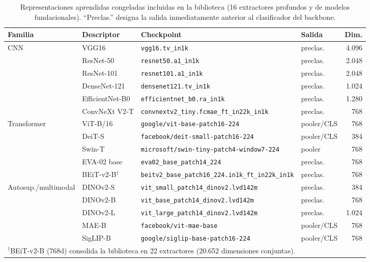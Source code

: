 \begin{table}[!ht]
\centering
\caption{Representaciones aprendidas congeladas incluidas en la biblioteca (16 extractores profundos y de modelos fundacionales). ``Preclas.'' designa la salida inmediatamente anterior al clasificador del backbone.}
\label{tab:extractores-aprendidos}
\fontsize{9}{11}\selectfont
\begin{tabular}{@{}ll>{\raggedright\arraybackslash}p{6.5cm}lr@{}}
\toprule
Familia & Descriptor & Checkpoint & Salida & Dim. \\
\midrule
CNN & VGG16 & \texttt{vgg16.tv\_in1k} & preclas. & 4.096 \\
 & ResNet-50 & \texttt{resnet50.a1\_in1k} & preclas. & 2.048 \\
 & ResNet-101 & \texttt{resnet101.a1\_in1k} & preclas. & 2.048 \\
 & DenseNet-121 & \texttt{densenet121.tv\_in1k} & preclas. & 1.024 \\
 & EfficientNet-B0 & \texttt{efficientnet\_b0.ra\_in1k} & preclas. & 1.280 \\
 & ConvNeXt V2-T & \texttt{convnextv2\_tiny.fcmae\_ft\_in22k\_in1k} & preclas. & 768 \\
\midrule
Transformer & ViT-B/16 & \texttt{google/vit-base-patch16-224} & pooler/CLS & 768 \\
 & DeiT-S & \texttt{facebook/deit-small-patch16-224} & pooler/CLS & 384 \\
 & Swin-T & \texttt{microsoft/swin-tiny-patch4-window7-224} & pooler & 768 \\
 & EVA-02 base & \texttt{eva02\_base\_patch14\_224} & preclas. & 768 \\
 & BEiT-v2-B$^\dagger$ & \texttt{beitv2\_base\_patch16\_224.}\allowbreak\texttt{in1k\_ft\_in22k\_in1k} & preclas. & 768 \\
\midrule
Autosup./multimodal & DINOv2-S & \texttt{vit\_small\_patch14\_dinov2.lvd142m} & preclas. & 384 \\
 & DINOv2-B & \texttt{vit\_base\_patch14\_dinov2.lvd142m} & preclas. & 768 \\
 & DINOv2-L & \texttt{vit\_large\_patch14\_dinov2.lvd142m} & preclas. & 1.024 \\
 & MAE-B & \texttt{facebook/vit-mae-base} & pooler/CLS & 768 \\
 & SigLIP-B & \texttt{google/siglip-base-patch16-224} & pooler/CLS & 768 \\
\bottomrule
\multicolumn{5}{l}{\footnotesize $^\dagger$BEiT-v2-B (768d) consolida la biblioteca en 22 extractores (20.652 dimensiones conjuntas).}
\end{tabular}
\end{table}

